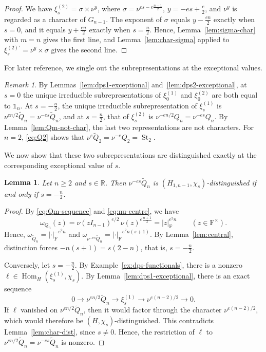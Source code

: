 \documentclass[11pt]{amsart}
\numberwithin{equation}{section}
\theoremstyle{plain}
\newtheorem{lemma}[theorem]{Lemma}
\theoremstyle{definition}
\theoremstyle{remark}
\newtheorem{remark}[theorem]{Remark}
\newcommand{\R}{\mathbb{R}}
\newcommand{\one}{\mathds{1}}
\DeclareMathOperator{\Hom}{Hom}
\DeclareMathOperator{\St}{St}
\newcommand{\Qt}{\widetilde{Q}}
\newcommand{\xione}{\xi^{(1)}}
\newcommand{\xitwo}{\xi^{(2)}}
\begin{document}
\begin{proof}
	We have $\xitwo_s=\sigma\times\nu^y$, where $\sigma=\nu^{es-e\frac{n-1}2}$, $y=-es+\frac e2$, and $\nu^y$ is regarded as a character of $G_{n-1}$. The exponent of $\sigma$ equals $y-\frac{en}2$ exactly when $s=0$, and it equals $y+\frac{en}2$ exactly when $s=\frac n2$. Hence, Lemma~\ref{lem:sigma-char} with $m=n$ gives the first line, and Lemma~\ref{lem:char-sigma} applied to $\xi^{(2)\prime}_s=\nu^y\times\sigma$ gives the second line.
\end{proof}

For later reference, we single out the subrepresentations at the exceptional values.

\begin{remark}\label{rem:exceptional-sub}
	By Lemmas~\ref{lem:dps1-exceptional} and~\ref{lem:dps2-exceptional}, at $s=0$ the unique irreducible subrepresentations of $\xione_0$ and $\xitwo_0$ are both equal to $\one_n$. At $s=-\frac n2$, the unique irreducible subrepresentation of $\xione_s$ is $\nu^{en/2}\Qt_n=\nu^{-es}\Qt_n$, and at $s=\frac n2$, that of $\xitwo_s$ is $\nu^{-en/2}Q_n=\nu^{-es}Q_n$. By Lemma~\ref{lem:Qm-not-char}, the last two representations are not characters. For $n=2$, \eqref{eq:Q2} shows that $\nu^{e}\Qt_2=\nu^{-e}Q_2=\St_2$.
\end{remark}

We now show that these two subrepresentations are distinguished exactly at the corresponding exceptional value of $s$.

\begin{lemma}\label{lem:Qtilde-dist}
	Let $n\ge2$ and $s\in\R$. Then $\nu^{-es}\Qt_n$ is $(H_{1,n-1},\chi_s)$-distinguished if and only if $s=-\frac n2$.
\end{lemma}

\begin{proof}
	By \eqref{eq:Qm-sequence} and \eqref{eq:nu-centre}, we have
	$$
	\omega_{Q_n}(z)=\nu(zI_{n-1})^{e/2}\,\nu(z)^{e\frac{n+1}2}=|z|_{\mathrm{F}}^{e^2n}\qquad(z\in\mathrm{F}^\times).
	$$
	Hence, $\omega_{\Qt_n}=|\cdot|_{\mathrm{F}}^{-e^2n}$ and $\omega_{\nu^{-es}\Qt_n}=|\cdot|_{\mathrm{F}}^{-e^2n(s+1)}$. By Lemma~\ref{lem:central}, distinction forces $-n(s+1)=s(2-n)$, that is, $s=-\frac n2$.
	
	Conversely, let $s=-\frac n2$. By Example~\ref{ex:dps-functionals}, there is a nonzero $\ell\in\Hom_H(\xione_s,\chi_s)$. By Lemma~\ref{lem:dps1-exceptional}, there is an exact sequence
	$$
	0\to\nu^{en/2}\Qt_n\to\xione_s\to\nu^{e(n-2)/2}\to0.
	$$
	If $\ell$ vanished on $\nu^{en/2}\Qt_n$, then it would factor through the character $\nu^{e(n-2)/2}$, which would therefore be $(H,\chi_s)$-distinguished. This contradicts Lemma~\ref{lem:char-dist}, since $s\ne0$. Hence, the restriction of $\ell$ to $\nu^{en/2}\Qt_n=\nu^{-es}\Qt_n$ is nonzero.
\end{proof}
\end{document}
